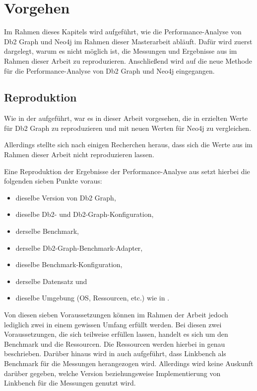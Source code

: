 \chapter{Vorgehen}
\label{vorgehen}
Im Rahmen dieses Kapitels wird aufgeführt, wie die Performance-Analyse von Db2 Graph und Neo4j im Rahmen dieser Masterarbeit abläuft. Dafür wird zuerst dargelegt, warum es nicht möglich ist, die Messungen und Ergebnisse aus \cite{sigmod_tian} im Rahmen dieser Arbeit zu reproduzieren. Anschließend wird auf die neue Methode für die Performance-Analyse von Db2 Graph und Neo4j eingegangen. 

\section{Reproduktion}
\label{analyse:reproduktion}
Wie in der  aufgeführt, war es in dieser Arbeit vorgesehen, die in \cite{sigmod_tian} erzielten Werte für Db2 Graph zu reproduzieren und mit neuen Werten für Neo4j zu vergleichen. 

Allerdings stellte sich nach einigen Recherchen heraus, dass sich die Werte aus \cite{sigmod_tian} im Rahmen dieser Arbeit nicht reproduzieren lassen. 

Eine Reproduktion der Ergebnisse der Performance-Analyse aus \cite{sigmod_tian} setzt hierbei die folgenden sieben Punkte voraus:
\begin{itemize}
    \item dieselbe Version von Db2 Graph,
    \item dieselbe Db2- und Db2-Graph-Konfiguration,
    \item derselbe Benchmark,
    \item derselbe Db2-Graph-Benchmark-Adapter,
    \item dieselbe Benchmark-Konfiguration,
    \item derselbe Datensatz und 
    \item dieselbe Umgebung (OS, Ressourcen, etc.) wie in \cite{sigmod_tian}.
\end{itemize}
Von diesen sieben Voraussetzungen können im Rahmen der Arbeit jedoch lediglich zwei in einem gewissen Umfang erfüllt werden. Bei diesen zwei Voraussetzungen, die sich teilweise erfüllen lassen, handelt es sich um den Benchmark und die Ressourcen. Die Ressourcen werden hierbei in \cite{sigmod_tian} genau beschrieben. Darüber hinaus wird in \cite{sigmod_tian} auch aufgeführt, dass Linkbench als Benchmark für die Messungen herangezogen wird. Allerdings wird keine Auskunft darüber gegeben, welche Version beziehungsweise Implementierung von Linkbench für die Messungen genutzt wird.


